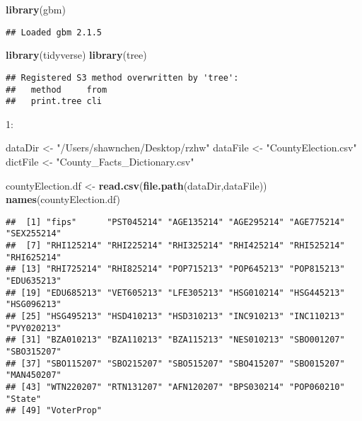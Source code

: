\documentclass[]{article}
\newenvironment{Shaded}{\begin{snugshade}}{\end{snugshade}}
\newcommand{\KeywordTok}[1]{\textcolor[rgb]{0.13,0.29,0.53}{\textbf{#1}}}
\newcommand{\NormalTok}[1]{#1}
\newcommand{\StringTok}[1]{\textcolor[rgb]{0.31,0.60,0.02}{#1}}
\begin{document}
\begin{Shaded}
\begin{Highlighting}[]
\KeywordTok{library}\NormalTok{(gbm)}
\end{Highlighting}
\end{Shaded}

\begin{verbatim}
## Loaded gbm 2.1.5
\end{verbatim}

\begin{Shaded}
\begin{Highlighting}[]
\KeywordTok{library}\NormalTok{(tidyverse)}
\KeywordTok{library}\NormalTok{(tree)}
\end{Highlighting}
\end{Shaded}

\begin{verbatim}
## Registered S3 method overwritten by 'tree':
##   method     from
##   print.tree cli
\end{verbatim}

1:

\begin{Shaded}
\begin{Highlighting}[]
\NormalTok{dataDir <-}\StringTok{ "/Users/shawnchen/Desktop/rzhw"}
\NormalTok{dataFile <-}\StringTok{ "CountyElection.csv"}
\NormalTok{dictFile <-}\StringTok{ "County_Facts_Dictionary.csv"}

\NormalTok{countyElection.df <-}\StringTok{ }\KeywordTok{read.csv}\NormalTok{(}\KeywordTok{file.path}\NormalTok{(dataDir,dataFile))}
\KeywordTok{names}\NormalTok{(countyElection.df)}
\end{Highlighting}
\end{Shaded}

\begin{verbatim}
##  [1] "fips"      "PST045214" "AGE135214" "AGE295214" "AGE775214" "SEX255214"
##  [7] "RHI125214" "RHI225214" "RHI325214" "RHI425214" "RHI525214" "RHI625214"
## [13] "RHI725214" "RHI825214" "POP715213" "POP645213" "POP815213" "EDU635213"
## [19] "EDU685213" "VET605213" "LFE305213" "HSG010214" "HSG445213" "HSG096213"
## [25] "HSG495213" "HSD410213" "HSD310213" "INC910213" "INC110213" "PVY020213"
## [31] "BZA010213" "BZA110213" "BZA115213" "NES010213" "SBO001207" "SBO315207"
## [37] "SBO115207" "SBO215207" "SBO515207" "SBO415207" "SBO015207" "MAN450207"
## [43] "WTN220207" "RTN131207" "AFN120207" "BPS030214" "POP060210" "State"    
## [49] "VoterProp"
\end{verbatim}
\end{document}
